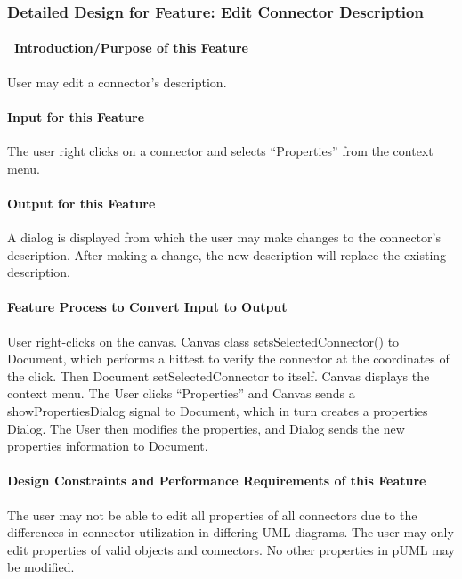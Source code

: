 \documentclass[twoside,letterpaper]{article}
\begin{document}
{\clearpage




% 
%

\subsubsection{Detailed Design for Feature: Edit Connector Description}

\paragraph[\ Introduction/Purpose of this Feature]
{\ Introduction/Purpose of this Feature}
{
User may edit a connector{\textquoteright}s description.
}

\paragraph[Input for this Feature]{Input for this Feature}
{
The user right clicks on a connector and selects ``Properties'' from the context menu.
}

\paragraph{Output for this Feature}
{
A dialog is displayed from which the user may make changes to the connector{\textquoteright}s description. After making a change, the new description will replace the existing description.
}

\paragraph{Feature Process to Convert Input to Output}
{
User right-clicks on the canvas. Canvas class setsSelectedConnector() to Document, which performs a hittest to verify the connector at the coordinates of the click. Then Document setSelectedConnector to itself. \newline
Canvas displays the context menu. The User clicks ``Properties'' and Canvas sends a showPropertiesDialog signal to Document, which in turn creates a properties Dialog.\newline
The User then modifies the properties, and Dialog sends the new properties information to Document.
}

\paragraph{Design Constraints and Performance Requirements of this Feature}
{
The user may not be able to edit all properties of all connectors due to the differences in connector utilization in differing UML diagrams. \newline
The user may only edit properties of valid objects and connectors. No other properties in pUML may be modified.
}
\bigskip
\bigskip

}
\end{document}

